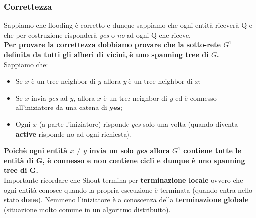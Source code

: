 \documentclass[12pt]{article}
\begin{document}
		\subsubsection{Correttezza}
			Sappiamo che flooding è corretto e dunque sappiamo che ogni entità riceverà Q e che per costruzione risponderà \textit{yes} o \textit{no} ad ogni Q che riceve.\\ 
			\textbf{ Per provare la correttezza dobbiamo provare che la sotto-rete $G^{1}$ definita da tutti gli alberi di vicini, è uno spanning tree di $G$.}\\
			Sappiamo che:
			\begin{itemize}
				\item Se $x$ è un tree-neighbor di $y$ allora $y$ è un tree-neighbor di $x$;
				\item Se $x$ invia \textit{yes}	ad $y$, allora $x$ è un tree-neighbor di $y$ ed è connesso all'iniziatore da una catena di \textbf{yes};
				\item Ogni $x$ (a parte l'iniziatore) risponde \textit{yes} solo una volta (quando diventa \textbf{active} risponde no ad ogni richiesta).
			\end{itemize}
			\textbf{Poichè ogni entità $x \neq y$ invia un solo \textit{yes} allora $G^{1}$ contiene tutte le entità di G, è connesso e non contiene cicli e dunque è uno spanning tree di G.}\\
			Importante ricordare che Shout termina per \textbf{terminazione locale} ovvero che ogni entità conosce quando la propria esecuzione è terminata (quando entra nello stato \textbf{done}). Nemmeno l'iniziatore è a conoscenza della \textbf{terminazione globale} (situazione molto comune in un algoritmo distribuito).
\end{document}
